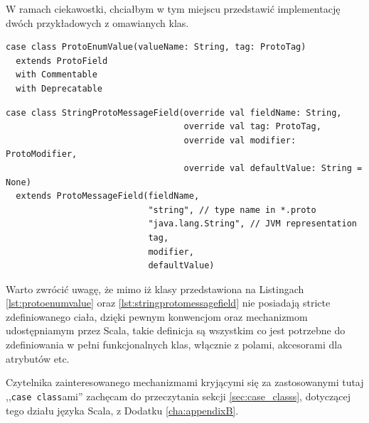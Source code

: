 \documentclass[pdflatex,11pt]{aghdpl}
\begin{document}
W ramach ciekawostki, chciałbym w tym miejscu przedstawić implementację dwóch przykładowych z omawianych klas.

\begin{lstlisting}[caption={Pełna implementacja klasy ProtoEnumValue}, label={lst:protoenumvalue}]
case class ProtoEnumValue(valueName: String, tag: ProtoTag)
  extends ProtoField
  with Commentable
  with Deprecatable
\end{lstlisting}

\begin{lstlisting}[caption={Pełna implementacja klasy StringProtoMessageField}, label={lst:stringprotomessagefield}]
case class StringProtoMessageField(override val fieldName: String,
                                   override val tag: ProtoTag,
                                   override val modifier: ProtoModifier,
                                   override val defaultValue: String = None)
  extends ProtoMessageField(fieldName, 
                            "string", // type name in *.proto
                            "java.lang.String", // JVM representation
                            tag, 
                            modifier,
                            defaultValue)
\end{lstlisting}

Warto zwrócić uwagę, że mimo iż klasy przedstawiona na Listingach \ref{lst:protoenumvalue} oraz \ref{lst:stringprotomessagefield} nie posiadają stricte 
zdefiniowanego ciała, dzięki pewnym konwencjom oraz mechanizmom udostępniamym przez Scala, takie definicja są 
wszystkim co jest potrzebne do zdefiniowania w pełni funkcjonalnych klas, włącznie z polami, akcesorami dla atrybutów etc.

Czytelnika zainteresowanego mechanizmami kryjącymi się za zastosowanymi tutaj ,,\verb|case class|ami'' zachęcam do przeczytania sekcji \ref{sec:case_classs},
dotyczącej tego działu języka Scala, z Dodatku \ref{cha:appendixB}.
\end{document}
